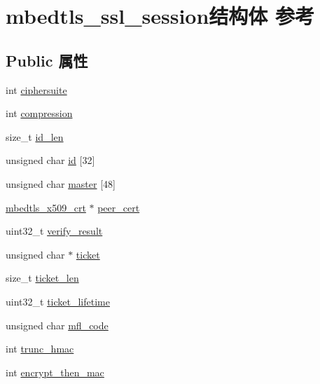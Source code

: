 \hypertarget{structmbedtls__ssl__session}{}\section{mbedtls\+\_\+ssl\+\_\+session结构体 参考}
\label{structmbedtls__ssl__session}
\subsection*{Public 属性}
\begin{DoxyCompactItemize}
\item 
int \hyperlink{structmbedtls__ssl__session_ad91239f4186bd272e3eb441c9c309b9e}{ciphersuite}
\item 
int \hyperlink{structmbedtls__ssl__session_a71b31d138a01adef0ef99f03084da801}{compression}
\item 
size\+\_\+t \hyperlink{structmbedtls__ssl__session_ad1bc5443b7ac77eadd1df71a69f18ba6}{id\+\_\+len}
\item 
unsigned char \hyperlink{structmbedtls__ssl__session_abd00d63c5fe4ae5dd87cbba60155fbc4}{id} \mbox{[}32\mbox{]}
\item 
unsigned char \hyperlink{structmbedtls__ssl__session_ae8adb932e053a2179530a8aff8750624}{master} \mbox{[}48\mbox{]}
\item 
\hyperlink{structmbedtls__x509__crt}{mbedtls\+\_\+x509\+\_\+crt} $\ast$ \hyperlink{structmbedtls__ssl__session_a2133d1643e524378f074bd9da89aca42}{peer\+\_\+cert}
\item 
uint32\+\_\+t \hyperlink{structmbedtls__ssl__session_a7767cf999b47eaa545fb6a86b3447a20}{verify\+\_\+result}
\item 
unsigned char $\ast$ \hyperlink{structmbedtls__ssl__session_ad639f04ea53fe3602f1188967187436f}{ticket}
\item 
size\+\_\+t \hyperlink{structmbedtls__ssl__session_a381594bf55513430e6c61bf287baf38b}{ticket\+\_\+len}
\item 
uint32\+\_\+t \hyperlink{structmbedtls__ssl__session_a0d6aad183f79d64f7eee544cd5277be2}{ticket\+\_\+lifetime}
\item 
unsigned char \hyperlink{structmbedtls__ssl__session_a9eb94cea53e9e6cb74e6f4204aee0a72}{mfl\+\_\+code}
\item 
int \hyperlink{structmbedtls__ssl__session_ad782325576a5b4c06bf55e2b9f2c7bcc}{trunc\+\_\+hmac}
\item 
int \hyperlink{structmbedtls__ssl__session_ac0ac3fa9cca796f14ae26cfbeb28e807}{encrypt\+\_\+then\+\_\+mac}
\end{DoxyCompactItemize}


